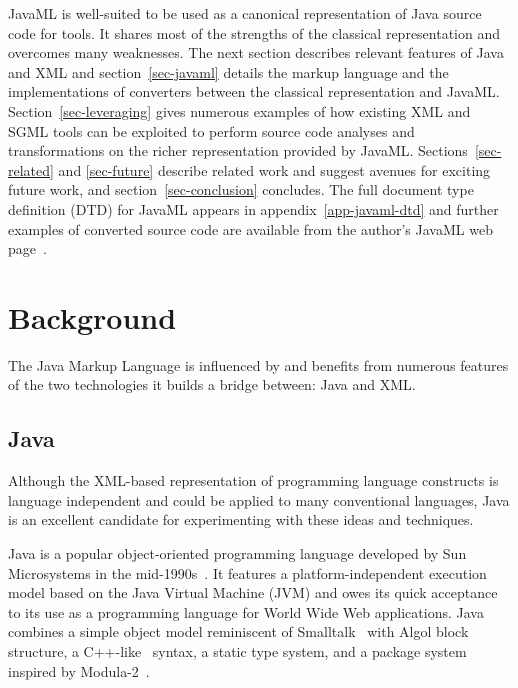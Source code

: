 \documentclass{article}
\begin{document}
\begin{multicols}{2}
JavaML is well-suited to be used as a canonical representation of Java
source code for tools.  It shares most of the strengths of the classical
representation and overcomes many weaknesses.  The next section
describes relevant features of Java and XML and section~\ref{sec-javaml}
details the markup language and the implementations of converters between
the classical representation and JavaML.  Section~\ref{sec-leveraging}
gives numerous examples of how existing XML and SGML tools can be
exploited to perform source code analyses and transformations on the
richer representation provided by JavaML.  Sections~\ref{sec-related}
and \ref{sec-future} describe related work and suggest avenues for
exciting future work, and section~\ref{sec-conclusion} concludes.  The
full document type definition (DTD) for JavaML appears in
appendix~\ref{app-javaml-dtd} and further examples of converted source
code are available from the author's JavaML web page~\cite{Badros-javaml}.

\section{Background}
\label{sec-background}

The Java Markup Language is influenced by and benefits from numerous
features of the two technologies it builds a bridge between: Java and
XML.

\subsection{Java}
\label{ssec-java}

Although the XML-based representation of programming language constructs
is language independent and could be applied to many conventional
languages, Java is an excellent candidate for experimenting with these
ideas and techniques.

Java is a popular object-oriented programming language developed by Sun
Microsystems in the mid-1990s~\cite{Arnold98,Flanagan97}.  It features a
platform-independent execution model based on the Java Virtual Machine
(JVM) and owes its quick acceptance to its use as a programming language
for World Wide Web applications.  Java combines a simple object model
reminiscent of Smalltalk~\cite{Goldberg89} with Algol block structure, a
C++-like~\cite{Stroustrup97} syntax, a static type system, and a package system
inspired by Modula-2~\cite{Modula2}.


\end{multicols}
\end{document}
